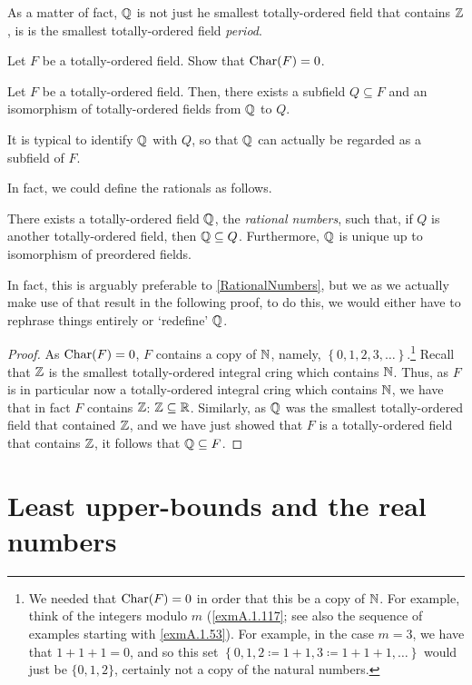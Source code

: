 As a matter of fact, $\mathbb{Q}$ is not just he smallest totally-ordered field that contains $\mathbb{Z}$, is is the smallest totally-ordered field \emph{period}.
\begin{exr}
Let $F$ be a totally-ordered field.  Show that $\operatorname{Char} (F)=0$.
\end{exr}
\begin{prp}\label{prp1.4.52}
Let $F$ be a totally-ordered field.  Then, there exists a subfield $Q\subseteq F$ and an isomorphism of totally-ordered fields from $\mathbb{Q}$ to $Q$.
\begin{rmk}
It is typical to identify $\mathbb{Q}$ with $Q$, so that $\mathbb{Q}$ can actually be regarded as a subfield of $F$.
\end{rmk}
\begin{rmk}
In fact, we could define the rationals as follows.
\begin{textequation}
There exists a totally-ordered field $\mathbb{Q}$, the \emph{rational numbers}, such that, if $Q$ is another totally-ordered field, then $\mathbb{Q} \subseteq Q$.  Furthermore, $\mathbb{Q}$ is unique up to isomorphism of preordered fields.
\end{textequation}
In fact, this is arguably preferable to \cref{RationalNumbers}, but we as we actually make use of that result in the following proof, to do this, we would either have to rephrase things entirely or `redefine' $\mathbb{Q}$.
\end{rmk}
\begin{proof}
As $\operatorname{Char} (F)=0$, $F$ contains a copy of $\mathbb{N}$, namely, $\left\{ 0,1,2,3,\ldots \right\}$.\footnote{We needed that $\operatorname{Char} (F)=0$ in order that this be a copy of $\mathbb{N}$.  For example, think of the integers modulo $m$ (\cref{exmA.1.117}; see also the sequence of examples starting with \cref{exmA.1.53}).  For example, in the case $m=3$, we have that $1+1+1=0$, and so this set $\left\{ 0,1,2\coloneqq 1+1,3\coloneqq 1+1+1,\ldots \right\}$ would just be $\{ 0,1,2\}$, certainly not a copy of the natural numbers.}  Recall that $\mathbb{Z}$ is the smallest totally-ordered integral cring which contains $\mathbb{N}$.  Thus, as $F$ is in particular now a totally-ordered integral cring which contains $\mathbb{N}$, we have that in fact $F$ contains $\mathbb{Z}$:  $\mathbb{Z} \subseteq \mathbb{R}$.  Similarly, as $\mathbb{Q}$ was the smallest totally-ordered field that contained $\mathbb{Z}$, and we have just showed that $F$ is a totally-ordered field that contains $\mathbb{Z}$, it follows that $\mathbb{Q} \subseteq F$.
\end{proof}
\end{prp}

\section{Least upper-bounds and the real numbers}

